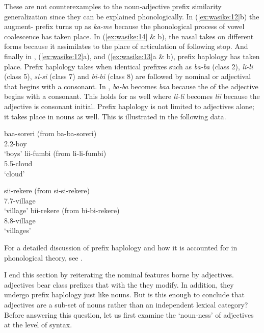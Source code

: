 \documentclass[output=paper,
modfonts
]{langscibook}
\begin{document}
These are not counterexamples to the noun-adjective prefix similarity generalization since they can be explained phonologically. In (\ref{ex:wasike:12}b) the augment- prefix turns up as \textit{ka-me} because the phonological process of vowel coalescence has taken place. In (\ref{ex:wasike:14} \& b), the nasal takes on different forms because it assimilates to the place of articulation of following stop. And finally in , (\ref{ex:wasike:12}a), and (\ref{ex:wasike:13}a \& b), prefix haplology has taken place. Prefix haplology takes when identical prefixes such as \textit{ba-ba} (class 2), \textit{li-li} (class 5), \textit{si-si} (class 7) and \textit{bi-bi} (class 8) are followed by nominal  or adjectival  that begins with a consonant. In , \textit{ba-ba} becomes \textit{baa} because the  of the adjective begins with a consonant. This holds for  as well where \textit{li-li} becomes \textit{lii} because the adjective  is consonant initial. Prefix haplology is not limited to adjectives alone; it takes place in nouns as well. This is illustrated in the following data.

\ea\label{ex:wasike:15}
\ea
\gll baa-soreri \textup{(from }ba-ba-soreri\textup{)}\\
     2.2-boy\\
\glt ‘boys’
\ex
\gll  lii-fumbi \textup{(from }li-li-fumbi\textup{)}\\
     5.5-cloud\\
\glt ‘cloud’
\z
\z

\ea\label{ex:wasike:16}
\ea
\gll sii-rekere \textup{(from }si-si-rekere\textup{)} \\
     7.7-village\\
\glt ‘village’
\ex
\gll  bii-rekere \textup{(from }bi-bi-rekere\textup{)}\\
     8.8-village\\
\glt ‘villages’
\z
\z

For a detailed discussion of prefix haplology and how it is accounted for in phonological theory, see \citet{Mutonyi2000}.

I end this section by reiterating the nominal features borne by  adjectives.  adjectives bear class prefixes that  with the  they modify. In addition, they undergo prefix haplology just like nouns. But is this enough to conclude that  adjectives are a sub-set of nouns rather than an independent lexical category? Before answering this question, let us first examine the ‘noun-ness’ of adjectives at the level of syntax.
\end{document}
